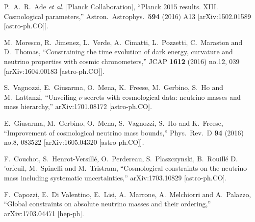 \documentclass[11pt,a4paper]{article}
\renewcommand\({\left(}
\renewcommand\){\right)}
\renewcommand\[{\left[}
\renewcommand\]{\right]}
\begin{document}




\providecommand{\href}[2]{#2}\begingroup\raggedright\begin{thebibliography}{10}

  P.~A.~R.~Ade {\it et al.} [Planck Collaboration],
  ``Planck 2015 results. XIII. Cosmological parameters,''
  Astron.\ Astrophys.\  {\bf 594} (2016) A13
  [arXiv:1502.01589 [astro-ph.CO]].

  M.~Moresco, R.~Jimenez, L.~Verde, A.~Cimatti, L.~Pozzetti, C.~Maraston and D.~Thomas,
  ``Constraining the time evolution of dark energy, curvature and neutrino properties with cosmic chronometers,''
  JCAP {\bf 1612} (2016) no.12,  039
  [arXiv:1604.00183 [astro-ph.CO]].
	
  S.~Vagnozzi, E.~Giusarma, O.~Mena, K.~Freese, M.~Gerbino, S.~Ho and M.~Lattanzi,
  ``Unveiling $\nu$ secrets with cosmological data: neutrino masses and mass hierarchy,''
  arXiv:1701.08172 [astro-ph.CO].
	
  E.~Giusarma, M.~Gerbino, O.~Mena, S.~Vagnozzi, S.~Ho and K.~Freese,
  ``Improvement of cosmological neutrino mass bounds,''
  Phys.\ Rev.\ D {\bf 94} (2016) no.8,  083522
  [arXiv:1605.04320 [astro-ph.CO]].
	
  F.~Couchot, S.~Henrot-Versillé, O.~Perdereau, S.~Plaszczynski, B.~Rouillé D. 'orfeuil, M.~Spinelli and M.~Tristram,
  ``Cosmological constraints on the neutrino mass including systematic uncertainties,''
  arXiv:1703.10829 [astro-ph.CO].
	
  F.~Capozzi, E.~Di Valentino, E.~Lisi, A.~Marrone, A.~Melchiorri and A.~Palazzo,
  ``Global constraints on absolute neutrino masses and their ordering,''
  arXiv:1703.04471 [hep-ph].
		

\end{thebibliography}
\end{document}
